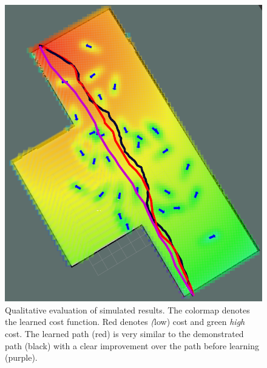 \documentclass[letterpaper, 10 pt, conference]{ieeeconf}
\begin{document}
	\begin{figure}[tbh]
	\centering
    \includegraphics[scale=0.15]{images/cf_w_plans.png}
    \caption{Qualitative evaluation of simulated results. The colormap denotes the learned cost function. Red denotes \emph(low) cost and green \emph{high} cost. The learned path (red) is very similar to the demonstrated path (black) with a clear improvement over the path before learning (purple).}
    \vspace{-2mm}
  \label{fig:results_qual}
  \end{figure}
\end{document}
